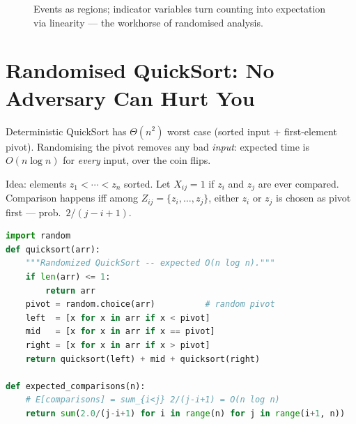 \begin{figure}[h]\centering
{}
\caption{Events as regions; indicator variables turn counting into expectation via linearity --- the workhorse of randomised analysis.}
\label{fig:prob-toolkit}
\end{figure}

\section{Randomised QuickSort: No Adversary Can Hurt You}
\label{sec:rqs}

Deterministic QuickSort has $\Theta(n^2)$ worst case (sorted input + first-element pivot). Randomising the pivot removes any bad \emph{input}: expected time is $O(n\log n)$ for \emph{every} input, over the coin flips.

Idea: elements $z_1<\cdots<z_n$ sorted. Let $X_{ij}=1$ if $z_i$ and $z_j$ are ever compared. Comparison happens iff among $Z_{ij}=\{z_i,\dots,z_j\}$, either $z_i$ or $z_j$ is chosen as pivot first --- prob.\ $2/(j-i+1)$.

\begin{lstlisting}[language=Python]
import random
def quicksort(arr):
    """Randomized QuickSort -- expected O(n log n)."""
    if len(arr) <= 1:
        return arr
    pivot = random.choice(arr)          # random pivot
    left  = [x for x in arr if x < pivot]
    mid   = [x for x in arr if x == pivot]
    right = [x for x in arr if x > pivot]
    return quicksort(left) + mid + quicksort(right)

def expected_comparisons(n):
    # E[comparisons] = sum_{i<j} 2/(j-i+1) = O(n log n)
    return sum(2.0/(j-i+1) for i in range(n) for j in range(i+1, n))
\end{lstlisting}


